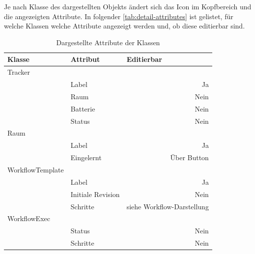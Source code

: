 Je nach Klasse des dargestellten Objekts ändert sich das Icon im Kopfbereich und die angezeigten Attribute.
In folgender \autoref{tab:detail-attributes} ist gelistet, für welche Klassen welche Attribute angezeigt werden und, ob diese editierbar sind.

\begin{table}[]
\centering
\begin{tabular}{l|l|r}
\textbf{Klasse}  & \textbf{Attribut} & \multicolumn{1}{l}{\textbf{Editierbar}} \\ \hline
Tracker          &                   &                                         \\
								 & Label             & Ja                                      \\
								 & Raum              & Nein                                    \\
								 & Batterie          & Nein                                    \\
								 & Status            & Nein                                    \\ \hline
Raum             &                   & \multicolumn{1}{l}{}                    \\
								 & Label             & Ja                                      \\
								 & Eingelernt        & Über Button                             \\ \hline
WorkflowTemplate &                   & \multicolumn{1}{l}{}                    \\
								 & Label             & Ja                                      \\
								 & Initiale Revision & Nein                                    \\
								 & Schritte          & siehe Workflow-Darstellung              \\ \hline
WorkflowExec     &                   & \multicolumn{1}{l}{}                    \\
								 & Status            & Nein                                    \\
								 & Schritte          & Nein
\end{tabular}
\caption{Dargestellte Attribute der Klassen}
\label{tab:detail-attributes}
\end{table}

